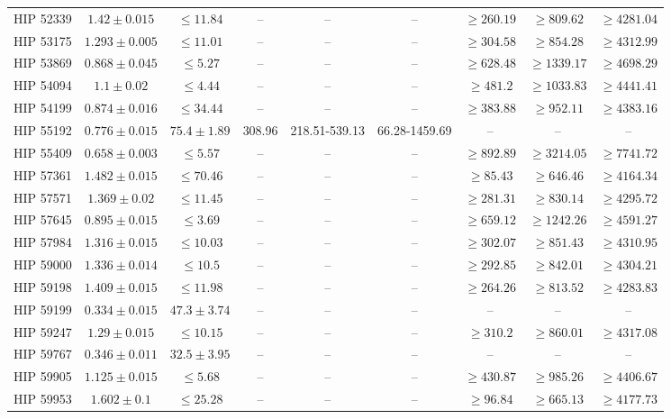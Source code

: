 {\begin{longtable}{|c|c|c|c|c|c|c|c|c|}
HIP 52339 & $ 1.42 \pm 0.015 $ & $\le 11.84 $ &-- &-- &-- & $\ge 260.19 $ & $\ge 809.62 $ & $\ge 4281.04 $ \\
HIP 53175 & $ 1.293 \pm 0.005 $ & $\le 11.01 $ &-- &-- &-- & $\ge 304.58 $ & $\ge 854.28 $ & $\ge 4312.99 $ \\
HIP 53869 & $ 0.868 \pm 0.045 $ & $\le 5.27 $ &-- &-- &-- & $\ge 628.48 $ & $\ge 1339.17 $ & $\ge 4698.29 $ \\
HIP 54094 & $ 1.1 \pm 0.02 $ & $\le 4.44 $ &-- &-- &-- & $\ge 481.2 $ & $\ge 1033.83 $ & $\ge 4441.41 $ \\
HIP 54199 & $ 0.874 \pm 0.016 $ & $\le 34.44 $ &-- &-- &-- & $\ge 383.88 $ & $\ge 952.11 $ & $\ge 4383.16 $ \\
HIP 55192 & $ 0.776 \pm 0.015 $ & $ 75.4 \pm 1.89 $ & 308.96 & 218.51-539.13 & 66.28-1459.69 &-- &-- &-- \\
HIP 55409 & $ 0.658 \pm 0.003 $ & $\le 5.57 $ &-- &-- &-- & $\ge 892.89 $ & $\ge 3214.05 $ & $\ge 7741.72 $ \\
HIP 57361 & $ 1.482 \pm 0.015 $ & $\le 70.46 $ &-- &-- &-- & $\ge 85.43 $ & $\ge 646.46 $ & $\ge 4164.34 $ \\
HIP 57571 & $ 1.369 \pm 0.02 $ & $\le 11.45 $ &-- &-- &-- & $\ge 281.31 $ & $\ge 830.14 $ & $\ge 4295.72 $ \\
HIP 57645 & $ 0.895 \pm 0.015 $ & $\le 3.69 $ &-- &-- &-- & $\ge 659.12 $ & $\ge 1242.26 $ & $\ge 4591.27 $ \\
HIP 57984 & $ 1.316 \pm 0.015 $ & $\le 10.03 $ &-- &-- &-- & $\ge 302.07 $ & $\ge 851.43 $ & $\ge 4310.95 $ \\
HIP 59000 & $ 1.336 \pm 0.014 $ & $\le 10.5 $ &-- &-- &-- & $\ge 292.85 $ & $\ge 842.01 $ & $\ge 4304.21 $ \\
HIP 59198 & $ 1.409 \pm 0.015 $ & $\le 11.98 $ &-- &-- &-- & $\ge 264.26 $ & $\ge 813.52 $ & $\ge 4283.83 $ \\
HIP 59199 & $ 0.334 \pm 0.015 $ & $ 47.3 \pm 3.74 $ & -- & -- & -- & -- & -- & -- \\
HIP 59247 & $ 1.29 \pm 0.015 $ & $\le 10.15 $ &-- &-- &-- & $\ge 310.2 $ & $\ge 860.01 $ & $\ge 4317.08 $ \\
HIP 59767 & $ 0.346 \pm 0.011 $ & $ 32.5 \pm 3.95 $ & -- & -- & -- & -- & -- & -- \\
HIP 59905 & $ 1.125 \pm 0.015 $ & $\le 5.68 $ &-- &-- &-- & $\ge 430.87 $ & $\ge 985.26 $ & $\ge 4406.67 $ \\
HIP 59953 & $ 1.602 \pm 0.1 $ & $\le 25.28 $ &-- &-- &-- & $\ge 96.84 $ & $\ge 665.13 $ & $\ge 4177.73 $ \\

\end{longtable}}
